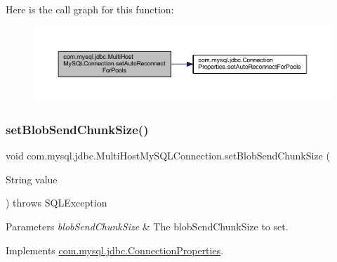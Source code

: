 Here is the call graph for this function\+:
\nopagebreak
\begin{figure}[H]
\begin{center}
\leavevmode
\includegraphics[width=350pt]{classcom_1_1mysql_1_1jdbc_1_1_multi_host_my_s_q_l_connection_a74082ba356c0d803169347d2abae7efa_cgraph}
\end{center}
\end{figure}
\mbox{\label{classcom_1_1mysql_1_1jdbc_1_1_multi_host_my_s_q_l_connection_a8ab368d3783dcf159d7b5055fa104362}} 
\subsubsection{\texorpdfstring{set\+Blob\+Send\+Chunk\+Size()}{setBlobSendChunkSize()}}
{\footnotesize\ttfamily void com.\+mysql.\+jdbc.\+Multi\+Host\+My\+S\+Q\+L\+Connection.\+set\+Blob\+Send\+Chunk\+Size (\begin{DoxyParamCaption}\item[{String}]{value }\end{DoxyParamCaption}) throws S\+Q\+L\+Exception}


\begin{DoxyParams}{Parameters}
{\em blob\+Send\+Chunk\+Size} & The blob\+Send\+Chunk\+Size to set. \\
\hline
\end{DoxyParams}


Implements \mbox{\hyperlink{interfacecom_1_1mysql_1_1jdbc_1_1_connection_properties_ab16063397e021c5f18662127d274d4d5}{com.\+mysql.\+jdbc.\+Connection\+Properties}}.

